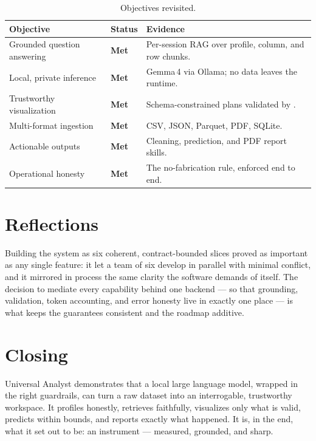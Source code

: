 \begin{table}[h]
\centering
\caption{Objectives revisited.}
\small
\begin{tabularx}{\linewidth}{@{}L{5.0cm} C{2.2cm} X@{}}
\toprule
\textbf{Objective} & \textbf{Status} & \textbf{Evidence} \\
\midrule
Grounded question answering & \textcolor{uaGreen}{\textbf{Met}} & Per-session RAG
over profile, column, and row chunks. \\
Local, private inference & \textcolor{uaGreen}{\textbf{Met}} & Gemma\,4 via
Ollama; no data leaves the runtime. \\
Trustworthy visualization & \textcolor{uaGreen}{\textbf{Met}} & Schema-constrained
plans validated by . \\
Multi-format ingestion & \textcolor{uaGreen}{\textbf{Met}} & CSV, JSON, Parquet,
PDF, SQLite. \\
Actionable outputs & \textcolor{uaGreen}{\textbf{Met}} & Cleaning, prediction, and
PDF report skills. \\
Operational honesty & \textcolor{uaGreen}{\textbf{Met}} & The no-fabrication rule,
enforced end to end. \\
\bottomrule
\end{tabularx}
\end{table}

\section{Reflections}
Building the system as six coherent, contract-bounded slices proved as important
as any single feature: it let a team of six develop in parallel with minimal
conflict, and it mirrored in process the same clarity the software demands of
itself. The decision to mediate every capability behind one backend --- so that
grounding, validation, token accounting, and error honesty live in exactly one
place --- is what keeps the guarantees consistent and the roadmap additive.

\section{Closing}
Universal Analyst demonstrates that a local large language model, wrapped in the
right guardrails, can turn a raw dataset into an interrogable, trustworthy
workspace. It profiles honestly, retrieves faithfully, visualizes only what is
valid, predicts within bounds, and reports exactly what happened. It is, in the
end, what it set out to be: an instrument --- measured, grounded, and sharp.

\begin{center}
\vspace{6pt}
\end{center}
